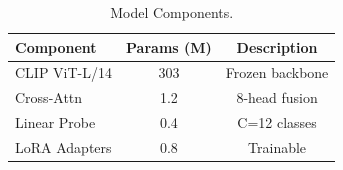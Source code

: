 \begin{table}[htbp]
\centering
\caption{Model Components.}
\label{tab:III}
\begin{tabular}{@{}lcc@{}}
\toprule
Component & Params (M) & Description \\
\midrule
CLIP ViT-L/14 & 303 & Frozen backbone \\
Cross-Attn & 1.2 & 8-head fusion \\
Linear Probe & 0.4 & C=12 classes \\
LoRA Adapters & 0.8 & Trainable \\
\bottomrule
\end{tabular}
\end{table}
